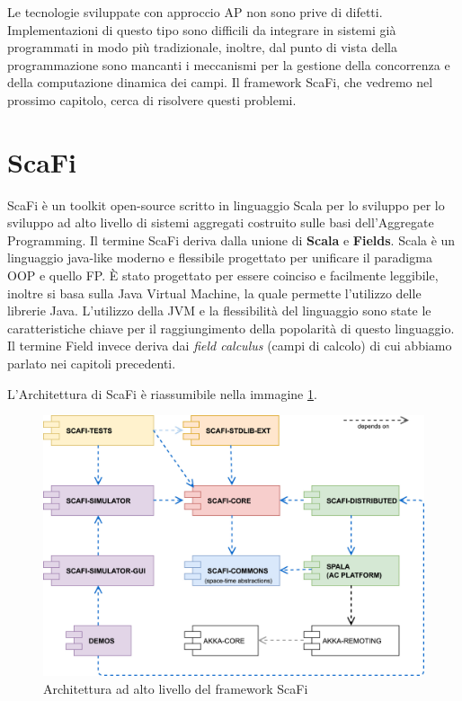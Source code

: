 \documentclass[12pt,a4paper,openright,twoside]{book}
\begin{document}
Le tecnologie sviluppate con approccio \ac{AP} non sono prive di difetti. 
Implementazioni di questo tipo sono difficili da integrare in sistemi già programmati in modo più tradizionale, inoltre, dal punto di vista della programmazione sono mancanti i meccanismi per la gestione della concorrenza e della computazione dinamica dei campi. Il framework ScaFi, che vedremo nel prossimo capitolo, cerca di risolvere questi problemi.


\section{ScaFi}

ScaFi è un toolkit open-source scritto in linguaggio Scala per lo sviluppo per lo sviluppo ad alto livello di sistemi aggregati costruito sulle basi dell'Aggregate Programming.
Il termine ScaFi deriva dalla unione di \textbf{Scala} e \textbf{Fields}. Scala è un linguaggio java-like moderno e flessibile progettato per unificare il paradigma \ac{OOP} e quello \ac{FP}. È stato progettato per essere coinciso e facilmente leggibile, inoltre si basa sulla Java Virtual Machine, la quale permette l'utilizzo delle librerie Java. L'utilizzo della JVM e la flessibilità del linguaggio sono state le caratteristiche chiave per il raggiungimento della popolarità di questo linguaggio. Il termine Field invece deriva dai \textit{field calculus} (campi di calcolo) di cui abbiamo parlato nei capitoli precedenti.

L'Architettura di ScaFi \cite{Casadei2022} è riassumibile nella immagine \cref{fig:scafi-arc}.

\begin{figure}
    \centering
    \includegraphics[width=.8\linewidth]{figures/scafi-arc.jpg}
    \caption{Architettura ad alto livello del framework ScaFi}
    \label{fig:scafi-arc}
\end{figure}
\end{document}
